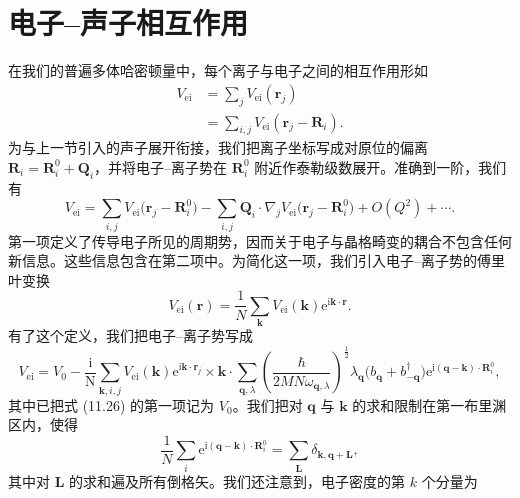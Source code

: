 \section{电子–声子相互作用}

在我们的普遍多体哈密顿量中，每个离子与电子之间的相互作用形如
\begin{equation*}
\begin{aligned}
V_{\mathrm{ei}}&=\sum_j V_{\mathrm{ei}}(\mathbf{r}_j)\\
&=\sum_{i,j}V_{\mathrm{ei}}(\mathbf{r}_j-\mathbf{R}_i).
\end{aligned}\tag{11.25}
\end{equation*}
为与上一节引入的声子展开衔接，我们把离子坐标写成对原位的偏离 $\mathbf{R}_i=\mathbf{R}_i^0+\mathbf{Q}_i$，并将电子–离子势在 $\mathbf{R}_i^0$ 附近作泰勒级数展开。准确到一阶，我们有
\begin{equation*}
V_{\mathrm{ei}}=\sum_{i,j}V_{\mathrm{ei}}\bigl(\mathbf{r}_j-\mathbf{R}_i^0\bigr)-\sum_{i,j}\mathbf{Q}_i\cdot\nabla_j V_{\mathrm{ei}}\bigl(\mathbf{r}_j-\mathbf{R}_i^0\bigr)+O(Q^2)+\cdots.\tag{11.26}
\end{equation*}
第一项定义了传导电子所见的周期势，因而关于电子与晶格畸变的耦合不包含任何新信息。这些信息包含在第二项中。为简化这一项，我们引入电子–离子势的傅里叶变换
\begin{equation*}
V_{\mathrm{ei}}(\mathbf{r})=\frac{1}{N}\sum_{\mathbf{k}}V_{\mathrm{ei}}(\mathbf{k})\mathrm{e}^{\mathrm{i}\mathbf{k}\cdot\mathbf{r}}.\tag{11.27}
\end{equation*}
有了这个定义，我们把电子–离子势写成
\begin{equation*}
V_{\mathrm{ei}}=V_0-\frac{\mathrm{i}}{\mathrm{N}}\sum_{\mathbf{k},i,j}V_{\mathrm{ei}}(\mathbf{k})\mathrm{e}^{\mathrm{i}\mathbf{k}\cdot\mathbf{r}_j}\times\mathbf{k}\cdot\sum_{\mathbf{q},\lambda}\left(\frac{\hbar}{2MN\omega_{\mathbf{q},\lambda}}\right)^{\frac{1}{2}}\lambda_{\mathbf{q}}\bigl(b_{\mathbf{q}}+b_{-\mathbf{q}}^{\dagger}\bigr)\mathrm{e}^{\mathrm{i}(\mathbf{q}-\mathbf{k})\cdot\mathbf{R}_i^0},\tag{11.28}
\end{equation*}
其中已把式 (11.26) 的第一项记为 $V_0$。我们把对 $\mathbf{q}$ 与 $\mathbf{k}$ 的求和限制在第一布里渊区内，使得
\begin{equation*}
\frac{1}{N}\sum_i\mathrm{e}^{\mathrm{i}(\mathbf{q}-\mathbf{k})\cdot\mathbf{R}_i^0}=\sum_{\mathbf{L}}\delta_{\mathbf{k},\mathbf{q}+\mathbf{L}},\tag{11.29}
\end{equation*}
其中对 $\mathbf{L}$ 的求和遍及所有倒格矢。我们还注意到，电子密度的第 $k$ 个分量为
